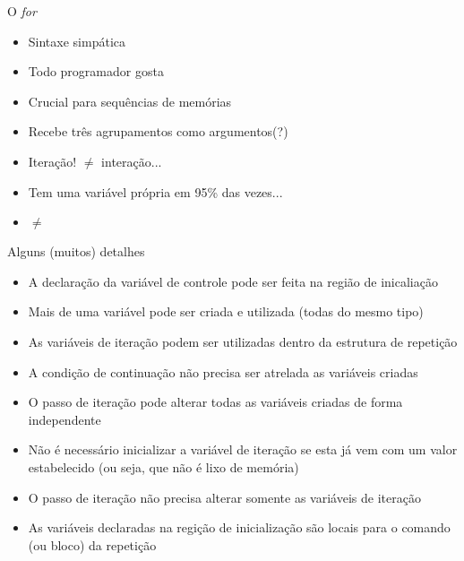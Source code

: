 \documentclass[14pt]{beamer}
\begin{document}
		\begin{frame}{O \textit{for}}
					\begin{itemize}
						\presentationPause\item Sintaxe simpática
						\presentationPause\item Todo programador gosta
						\presentationPause\item Crucial para sequências de memórias
						\presentationPause\item Recebe três agrupamentos como argumentos\presentationPause(?)
						\presentationPause\item Iteração! \presentationPause $\neq$ interação...
						\presentationPause\item Tem uma variável própria \presentationPause em 95\% das vezes...
						\presentationPause\item {} $\neq$ 
					\end{itemize}
					\presentationPause
					\presentationPause
		\end{frame}

		\begin{frame}{Alguns (muitos) detalhes}
			\begin{itemize}
				\presentationPause\item A declaração da variável de controle pode ser feita na região de inicaliação
				\presentationPause\item Mais de uma variável pode ser criada e utilizada (todas do mesmo tipo)
				\presentationPause\item As variáveis de iteração podem ser utilizadas dentro da estrutura de repetição
				\presentationPause\item A condição de continuação não precisa ser atrelada as variáveis criadas
				\presentationPause\item O passo de iteração pode alterar todas as variáveis criadas de forma independente
				\presentationPause\item Não é necessário inicializar a variável de iteração se esta já vem com um valor estabelecido (ou seja, que não é lixo de memória)
				\presentationPause\item O passo de iteração não precisa alterar somente as variáveis de iteração
				\presentationPause\item As variáveis declaradas na regição de inicialização são locais para o comando (ou bloco) da repetição
			\end{itemize}
		\end{frame}
\end{document}
